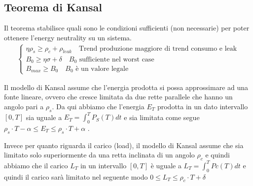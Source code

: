 \subsection{Teorema di Kansal}
Il teorema stabilisce quali sono le condizioni sufficienti (non necessarie) per poter ottenere l'energy neutrality su un sistema.
\begin{align}
    \begin{cases}
        \eta \rho_s \geq \rho_c + \rho_{leak} \quad \text{Trend produzione maggiore di trend consumo e leak} \\
        B_0 \geq \eta \sigma + \delta \quad \text{$B_0$ sufficiente nel worst case} \\
        B_{max} \geq B_0 \quad \text{$B_0$ è un valore legale}
    \end{cases}
\end{align}




Il modello di Kansal assume che l'energia prodotta si possa approssimare ad una fonte lineare, ovvero che cresce limitata da due rette parallele che hanno un angolo pari a $\rho_s$. Da qui abbiamo che l'energia $E_T$ prodotta in un dato intervallo $[0, T]$ sia uguale a $E_T=\int_0^T P_S(T) dt$ e sia limitata come segue $\rho_s \cdot T-\alpha \leq E_T \leq \rho_s \cdot T+\alpha$ . 

Invece per quanto riguarda il carico (load), il modello di Kansal assume che sia limitato solo superiormente da una retta inclinata di un angolo $\rho_c$ e quindi abbiamo che il carico $L_T$ in un intervallo $[0,T]$ è uguale a $L_T=\int_0^T Pc(T)dt$ e quindi il carico sarà limitato nel seguente modo $0 \leq L_T \leq \rho_c \cdot T+\delta$


